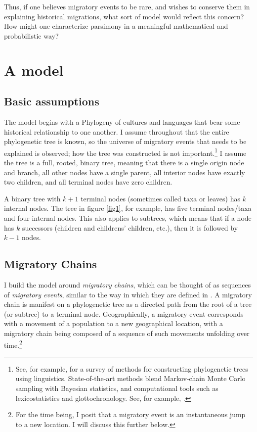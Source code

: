 \documentclass[11pt]{article}
\begin{document}
Thus,  if one believes migratory events to be rare, and wishes to conserve them in explaining historical migrations, what sort of model would reflect this concern? How might one characterize parsimony in a meaningful mathematical and probabilistic way? 

\section{A model}

\subsection{Basic assumptions }

The model begins with a Phylogeny of cultures and languages that bear some historical relationship to one another. I assume throughout that the entire phylogenetic tree is known, so the universe of migratory events that needs to be explained is observed; how the  tree was constructed is not important.\footnote{See, for example, \citet{nichols97} for a survey of methods for constructing phylogenetic trees using linguistics. State-of-the-art methods blend Markov-chain Monte Carlo sampling with Bayesian statistics, and computational tools such as lexicostatistics and glottochronology. See, for example, \cite{atkinson03}.}  I assume the tree is a full, rooted, binary tree, meaning that there is a single origin node and branch, all other nodes have a single parent, all interior nodes have exactly two children, and all terminal nodes have zero children. 

A binary tree with $k+1$ terminal nodes (sometimes called taxa or leaves) has $k$ internal nodes. The tree in figure \ref{fig1}, for example,  has five terminal nodes/taxa  and four internal nodes. This also applies to subtrees, which means that if a node has $k$ successors (children and childrens' children, etc.), then it is followed by $k-1$ nodes.

\subsection{Migratory Chains}
 
I build the model around \textit{migratory chains}, which can be thought of as sequences of \textit{migratory events}, similar to the way in which they are defined in \cite{dyen56}. A migratory chain is manifest on a phylogenetic tree as a directed path from the root of a tree (or subtree) to a terminal node. Geographically, a migratory event corresponds with a movement of a population to a new geographical location, with a migratory chain being composed of a sequence of such movements unfolding over time.\footnote{For the time being, I posit that a migratory event is an instantaneous jump to a new location. I will discuss this further below.}
\end{document}
